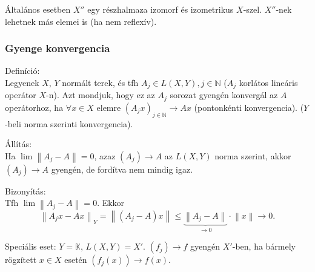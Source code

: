 \documentclass[12pt,a4paper]{scrartcl}
\newenvironment{definicio}{}{}
\newenvironment{bizonyitas}{}{}
\newenvironment{allitas}{}{}
\begin{document}
Általános esetben \(X''\) egy részhalmaza izomorf és izometrikus
\(X\)-szel. \(X''\)-nek lehetnek más elemei is (ha nem reflexív).

\hypertarget{gyenge-konvergencia}{%
\subsubsection{Gyenge konvergencia}\label{gyenge-konvergencia}}

\begin{definicio}

Definíció:\\
Legyenek \(X\), \(Y\) normált terek, és tfh
\(A_{j} \in L\left( {X,Y} \right),j \in {\mathbb{N}}\) (\(A_{j}\)
korlátos lineáris operátor \(X\)-n). Azt mondjuk, hogy ez az \(A_{j}\)
sorozat gyengén konvergál az \(A\) operátorhoz, ha \(\forall x \in X\)
elemre
\(\left. \left( {A_{j}x} \right)_{j \in {\mathbb{N}}}\rightarrow Ax \right.\)
(pontonkénti konvergencia). (\(Y\)-beli norma szerinti konvergencia).

\end{definicio}

\begin{allitas}

Állítás:\\
Ha \(\lim\left\| {A_{j} - A} \right\| = 0\), azaz
\(\left. \left( A_{j} \right)\rightarrow A \right.\) az
\(L\left( {X,Y} \right)\) norma szerint, akkor
\(\left. \left( A_{j} \right)\rightarrow A \right.\) gyengén, de
fordítva nem mindig igaz.

\end{allitas}

\begin{bizonyitas}

Bizonyítás:\\
Tfh \(\lim\left\| {A_{j} - A} \right\| = 0\). Ekkor
\[{\left\| {{A_j}x - Ax} \right\|_Y} = \left\| {\left( {{A_j} - A} \right)x} \right\| \leqslant \underbrace {\left\| {{A_j} - A} \right\|}_{ \to 0} \cdot \left\| x \right\| \to 0 .\]

\end{bizonyitas}

Speciális eset: \(Y = {\mathbb{K}}\), \(L\left( {X,Y} \right) = X'\).
\(\left. \left( f_{j} \right)\rightarrow f \right.\) gyengén \(X'\)-ben,
ha bármely rögzített \(x \in X\) esetén
\(\left. \left( {f_{j}\left( x \right)} \right)\rightarrow f\left( x \right) \right.\).
\end{document}
